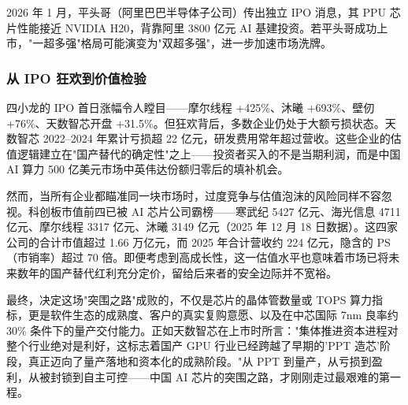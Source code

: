 2026 年 1 月，平头哥（阿里巴巴半导体子公司）传出独立 IPO 消息，其 PPU 芯片性能接近 NVIDIA H20，背靠阿里 3800 亿元 AI 基建投资。若平头哥成功上市，"一超多强"格局可能演变为"双超多强"，进一步加速市场洗牌。

\subsubsection{从 IPO 狂欢到价值检验}

四小龙的 IPO 首日涨幅令人瞠目——摩尔线程 +425\%、沐曦 +693\%、壁仞 +76\%、天数智芯开盘 +31.5\%。但狂欢背后，多数企业仍处于大额亏损状态。天数智芯 2022--2024 年累计亏损超 22 亿元，研发费用常年超过营收。这些企业的估值逻辑建立在"国产替代的确定性"之上——投资者买入的不是当期利润，而是中国 AI 算力 500 亿美元市场中英伟达份额归零后的填补机会。

然而，当所有企业都瞄准同一块市场时，过度竞争与估值泡沫的风险同样不容忽视。科创板市值前四已被 AI 芯片公司霸榜——寒武纪 5427 亿元、海光信息 4711 亿元、摩尔线程 3317 亿元、沐曦 3149 亿元（2025 年 12 月 18 日数据）。这四家公司的合计市值超过 1.66 万亿元，而 2025 年合计营收约 224 亿元，隐含的 PS（市销率）超过 70 倍。即便考虑到高成长性，这一估值水平也意味着市场已将未来数年的国产替代红利充分定价，留给后来者的安全边际并不宽裕。

最终，决定这场"突围之路"成败的，不仅是芯片的晶体管数量或 TOPS 算力指标，更是软件生态的成熟度、客户的真实复购意愿、以及在中芯国际 7nm 良率约 30\% 条件下的量产交付能力。正如天数智芯在上市时所言："集体推进资本进程对整个行业绝对是利好，这标志着国产 GPU 行业已经跨越了早期的'PPT 造芯'阶段，真正迈向了量产落地和资本化的成熟阶段。"从 PPT 到量产，从亏损到盈利，从被封锁到自主可控——中国 AI 芯片的突围之路，才刚刚走过最艰难的第一程。
